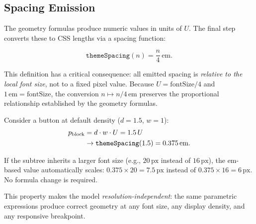 \subsection{Spacing Emission}
\label{sec:spacing-emission}

The geometry formulas produce numeric values in units of $U$. The final step converts these to CSS lengths via a spacing function:

\begin{equation}
\texttt{themeSpacing}(n) = \frac{n}{4}\,\text{em}.
\end{equation}

This definition has a critical consequence: all emitted spacing is \emph{relative to the local font size}, not to a fixed pixel value. Because $U = \text{fontSize} / 4$ and $1\,\text{em} = \text{fontSize}$, the conversion $n \mapsto n/4\,\text{em}$ preserves the proportional relationship established by the geometry formulas.

Consider a button at default density ($d = 1.5$, $w = 1$):
\begin{align}
p_{\text{block}} &= d \cdot w \cdot U = 1.5\,U \notag \\
&\to \texttt{themeSpacing}(1.5) = 0.375\,\text{em}. \notag
\end{align}

If the subtree inherits a larger font size (e.g., $20\,\text{px}$ instead of $16\,\text{px}$), the em-based value automatically scales: $0.375 \times 20 = 7.5\,\text{px}$ instead of $0.375 \times 16 = 6\,\text{px}$. No formula change is required.

This property makes the model \emph{resolution-independent}: the same parametric expressions produce correct geometry at any font size, any display density, and any responsive breakpoint.
